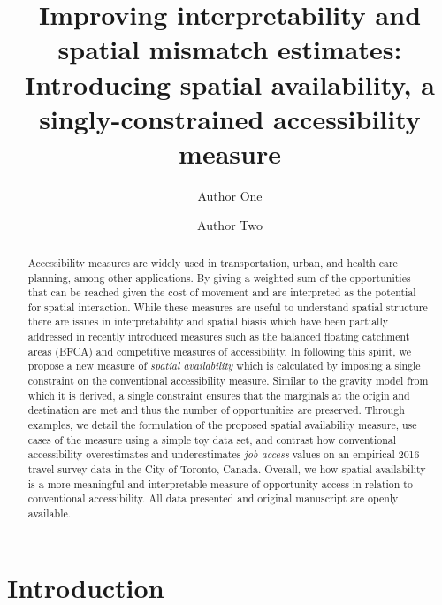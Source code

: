 \documentclass[]{elsarticle} %
\begin{document}
\begin{frontmatter}

  \title{Improving interpretability and spatial mismatch estimates:
Introducing spatial availability, a singly-constrained accessibility
measure}
    \author[Some School]{Author One}
    \author[Some School]{Author Two}
      \address[Some School]{Address}
  
  \begin{abstract}
  Accessibility measures are widely used in transportation, urban, and
  health care planning, among other applications. By giving a weighted
  sum of the opportunities that can be reached given the cost of
  movement and are interpreted as the potential for spatial interaction.
  While these measures are useful to understand spatial structure there
  are issues in interpretability and spatial biasis which have been
  partially addressed in recently introduced measures such as the
  balanced floating catchment areas (BFCA) and competitive measures of
  accessibility. In following this spirit, we propose a new measure of
  \emph{spatial availability} which is calculated by imposing a single
  constraint on the conventional accessibility measure. Similar to the
  gravity model from which it is derived, a single constraint ensures
  that the marginals at the origin and destination are met and thus the
  number of opportunities are preserved. Through examples, we detail the
  formulation of the proposed spatial availability measure, use cases of
  the measure using a simple toy data set, and contrast how conventional
  accessibility overestimates and underestimates \emph{job access}
  values on an empirical 2016 travel survey data in the City of Toronto,
  Canada. Overall, we how spatial availability is a more meaningful and
  interpretable measure of opportunity access in relation to
  conventional accessibility. All data presented and original manuscript
  are openly available.
  \end{abstract}
  
 \end{frontmatter}

\newpage

\hypertarget{introduction}{%
\section{Introduction}\label{introduction}}
\end{document}

